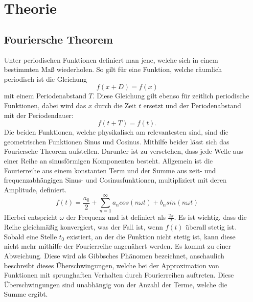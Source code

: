 \section{Theorie}
\label{sec:Theorie}

\subsection{Fouriersche Theorem}
Unter periodischen Funktionen definiert man jene, welche sich in einem bestimmten 
Maß wiederholen. So gilt für eine Funktion, welche räumlich periodisch ist die 
Gleichung
\begin{equation}
    \label{eqn:1}
    f(x+D) = f(x)
\end{equation}
mit einem Periodenabstand $T$. Diese Gleichung gilt ebenso für zeitlich periodische 
Funktionen, dabei wird das $x$ durch die Zeit $t$ ersetzt und der Periodenabstand 
mit der Periodendauer:
\begin{equation}
    \label{eqn:2}
    f(t+T) = f(t).
\end{equation}
Die beiden Funktionen, welche physikalisch am relevantesten sind, sind die 
geometrischen Funktionen Sinus und Cosinus. Mithilfe beider lässt sich das 
Fouriersche Theorem aufstellen. Darunter ist zu versetehen, dass jede Welle 
aus einer Reihe an sinusförmigen Komponenten besteht. Allgemein ist die 
Fourierreihe aus einem konstanten Term und der Summe aus zeit- und 
frequenzabhängigen Sinus- und Cosinusfunktionen, multipliziert mit deren 
Amplitude, definiert.
\begin{equation}
    \label{eqn:3}
    f(t) = \frac{a_0}{2} + \sum\limits_{n=1}^\infty a_n cos \left(n \omega t\right) + b_n sin \left(n \omega t\right)
\end{equation}
Hierbei entspricht $\omega$ der Frequenz und ist definiert als $\frac{2 \pi}{T}$.
Es ist wichtig, dass die Reihe gleichmäßig konvergiert, was der Fall ist, wenn 
$f(t)$ überall stetig ist. Sobald eine Stelle $t_0$ existiert, an der die Funktion 
nicht stetig ist, kann diese nicht mehr mithilfe der Fourierreihe angenähert 
werden. Es kommt zu einer Abweichung. Diese wird als Gibbsches Phänomen bezeichnet, 
anschaulich beschreibt dieses Überschwingungen, welche bei der Approximation 
von Funktionen mit sprunghaften Verhalten durch Fourierreihen auftreten. Diese 
Überschwingungen sind unabhängig von der Anzahl der Terme, welche die Summe ergibt.

